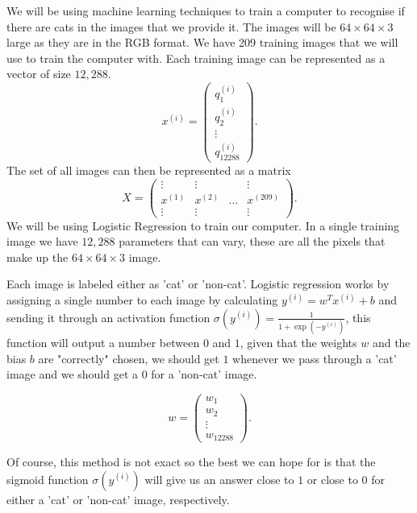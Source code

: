 We will be using machine learning techniques to train a computer to 
recognise if there are cats in the images that we provide it.
The images will be $64 \times 64 \times 3$ large as they are in the RGB
format.
We have 209 training images that we will use to train the computer with.
Each training image can be represented as a vector of size $12,288$.
\begin{equation}
    x^{(i)} = 
    \begin{pmatrix}
        q_1^{(i)} \\
        q_2^{(i)} \\
        \vdots \\
        q_{12288}^{(i)}
    \end{pmatrix}.
\end{equation}
The set of all images can then be represented as a matrix
\begin{equation}
    X = 
    \begin{pmatrix}
        \vdots & \vdots & & \vdots \\
        x^{(1)} & x^{(2)} & \dots & x^{(209)} \\
        \vdots & \vdots & & \vdots
    \end{pmatrix}.
\end{equation}
We will be using Logistic Regression to train our computer.
In a single training image we have $12,288$ parameters that can vary,
these are all the pixels that make up the $64 \times 64 \times 3$ image.

Each image is labeled either as 'cat' or 'non-cat'. Logistic regression
works by assigning a single number to each image by calculating
$y^{(i)} = w^T x^{(i)} + b$ and sending it through an activation function
$\sigma(y^{(i)}) = \frac{1}{1 + \exp(-y^{(i)}) }$, this function will output
a number between $0$ and $1$, given that the weights $w$ and the bias
$b$ are "correctly" chosen, we should get $1$ whenever we pass through
a 'cat' image and we should get a $0$ for a 'non-cat' image. 

\begin{equation}
    w = 
    \begin{pmatrix}
        w_1 \\
        w_2 \\
        \vdots \\
        w_{12288}
    \end{pmatrix}.
\end{equation}  

Of course, this method is not exact so the best we can hope for is
that the sigmoid function $\sigma(y^{(i)})$ will give us an answer close
to $1$ or close to $0$ for either a 'cat' or 'non-cat' image,
respectively.

